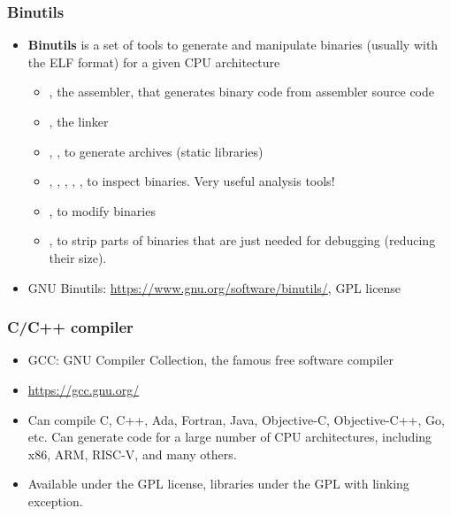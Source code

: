 \begin{frame}
  \frametitle{Binutils}
  \begin{itemize}
  \item {\bf Binutils} is a set of tools to generate and manipulate
        binaries (usually with the ELF format) for a given CPU architecture
    \begin{itemize}
    \item {}, the assembler, that generates binary code from assembler source code
    \item {}, the linker
    \item {}, , to generate  archives (static libraries)
    \item {}, , , , ,
          to inspect binaries. Very useful analysis tools!
    \item {}, to modify binaries
    \item {}, to strip parts of binaries that are just needed
          for debugging (reducing their size).
    \end{itemize}
  \item GNU Binutils: \url{https://www.gnu.org/software/binutils/}, GPL license
  \end{itemize}
\end{frame}

\begin{frame}
  \frametitle{C/C++ compiler}
  \begin{itemize}
  \item GCC: GNU Compiler Collection, the famous free software compiler
  \item \url{https://gcc.gnu.org/}
  \item Can compile C, C++, Ada, Fortran, Java, Objective-C,
        Objective-C++, Go, etc. Can generate code for a large number of CPU
        architectures, including x86, ARM, RISC-V, and many others.
  \item Available under the GPL license, libraries under the GPL with
        linking exception.
  \end{itemize}
\end{frame}

